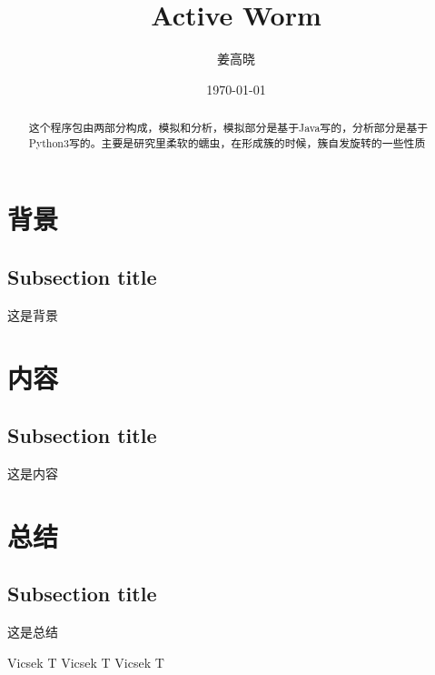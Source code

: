 \documentclass{article}
\begin{document}
\begin{CJK}{UTF8}{gkai}
\title{Active Worm}
\author{姜高晓}
\date{\today}
\maketitle
\begin{abstract}
这个程序包由两部分构成，模拟和分析，模拟部分是基于Java写的，分析部分是基于Python3写的。主要是研究里柔软的蠕虫，在形成簇的时候，簇自发旋转的一些性质
\end{abstract}

\section{背景}
\subsection{Subsection title}
 	这是背景
\section{内容}
\subsection{Subsection title}
        这是内容
\section{总结}
\subsection{Subsection title}
        这是总结




\begin{thebibliography}{12345}%
 Vicsek T
 Vicsek T
 Vicsek T


\end{thebibliography}
\end{CJK}
\end{document}
